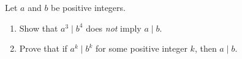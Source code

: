 Let $a$ and $b$ be positive integers.
\begin{enumerate}
\item[(a)] Show that $a^3\mid b^4$ does \emph{not} imply $a\mid b$.
\item[(b)] Prove that if $a^k\mid b^k$ for some positive integer $k$, then $a\mid b$.
\end{enumerate}
